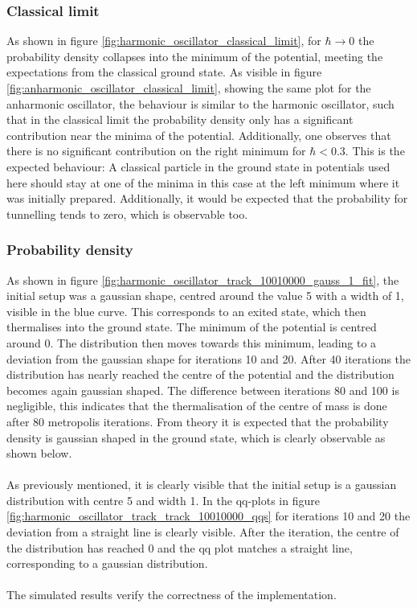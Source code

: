 \documentclass{scrartcl}
\begin{document}
	\subsubsection{Classical limit}
		As shown in figure \ref{fig:harmonic_oscillator_classical_limit}, for $\hbar \rightarrow 0$ the probability density collapses into the minimum of the potential, meeting the expectations from the classical ground state.
		As visible in figure \ref{fig:anharmonic_oscillator_classical_limit}, showing the same plot for the anharmonic oscillator, the behaviour is similar to the harmonic oscillator, such that in the classical limit the probability density only has a significant contribution near the minima of the potential.
		Additionally, one observes that there is no significant contribution on the right minimum for $\hbar < 0.3$.
		This is the expected behaviour:
		A classical particle in the ground state in potentials used here should stay at one of the minima in this case at the left minimum where it was initially prepared.
		Additionally, it would be expected that the probability for tunnelling tends to zero, which is observable too.

	\subsubsection{Probability density}
		As shown in figure \ref{fig:harmonic_oscillator_track_10010000_gauss_1_fit}, the initial setup was a gaussian shape, centred around the value 5 with a width of 1, visible in the blue curve.
		This corresponds to an exited state, which then thermalises into the ground state.
		The minimum of the potential is centred around 0.
		The distribution then moves towards this minimum, leading to a deviation from the gaussian shape for iterations 10 and 20.
		After 40 iterations the distribution has nearly reached the centre of the potential and the distribution becomes again gaussian shaped.
		The difference between iterations 80 and 100 is negligible, this indicates that the thermalisation of the centre of mass is done after 80 metropolis iterations.
		From theory it is expected that the probability density is gaussian shaped in the ground state, which is clearly observable as shown below.
		\\\\
		As previously mentioned, it is clearly visible that the initial setup is a gaussian distribution with centre 5 and width 1.
		In the qq-plots in figure \ref{fig:harmonic_oscillator_track_track_10010000_qqs} for iterations 10 and 20 the deviation from a straight line is clearly visible.
		After the  iteration, the centre of the distribution has reached 0 and the qq plot matches a straight line, corresponding to a gaussian distribution.
		\\\\
		The simulated results verify the correctness of the implementation.
\end{document}
